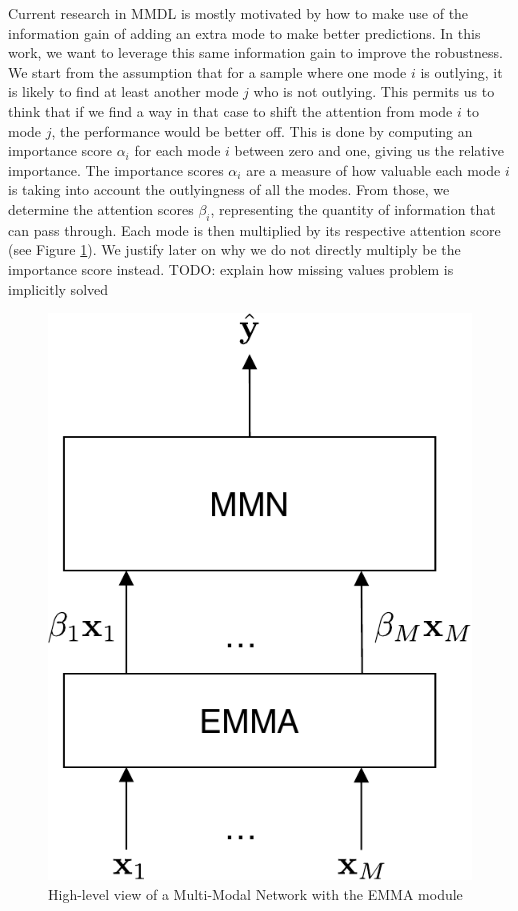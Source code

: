 Current research in MMDL is mostly motivated by how to make use of the information gain of adding an extra mode to make better predictions. In this work, we want to leverage this same information gain to improve the robustness. We start from the assumption that for a sample where one mode $i$ is outlying, it is likely to find at least another mode $j$ who is not outlying. This permits us to think that if we find a way in that case to shift the attention from mode $i$ to mode $j$, the performance would be better off. This is done by computing an importance score $\alpha_i$ for each mode $i$ between zero and one, giving us the relative importance. The importance scores $\alpha_i$ are a measure of how valuable each mode $i$ is taking into account the outlyingness of all the modes. From those, we determine the attention scores $\beta_i$, representing the quantity of information that can pass through. Each mode is then multiplied by its respective attention score (see Figure \ref{fig:mnn-with-emma}). We justify later on why we do not directly multiply be the importance score instead. TODO: explain how missing values problem is implicitly solved
\begin{figure}[!h]
\centering
\includegraphics[scale=0.5]{figures/mlp-with-emma}
\caption[High-level view of a Multi-Modal Network \& EMMA]{High-level view of a Multi-Modal Network with the EMMA module}	
\label{fig:mnn-with-emma}
\end{figure}

